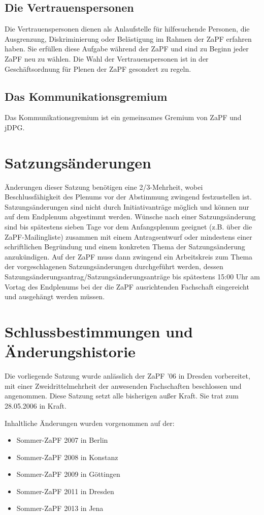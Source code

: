 \documentclass[draft,12pt,oneside]{scrreprt}
\begin{document}
\subsection{Die Vertrauenspersonen}

Die Vertrauenspersonen dienen als Anlaufstelle für hilfesuchende Personen, die
Ausgrenzung, Diskriminierung oder Belästigung im Rahmen der ZaPF erfahren haben.
Sie erfüllen diese Aufgabe während der ZaPF und sind zu Beginn jeder ZaPF neu
zu wählen.
Die Wahl der Vertrauenspersonen ist in der Geschäftsordnung für Plenen der ZaPF
gesondert zu regeln.

\subsection{Das Kommunikationsgremium}

Das Kommunikationsgremium ist ein gemeinsames Gremium von ZaPF und jDPG.

\section{Satzungsänderungen}
Änderungen dieser Satzung benötigen eine 2/3-Mehrheit, wobei Beschlussfähigkeit
des Plenums vor der Abstimmung zwingend festzustellen ist. Satzungsänderungen
sind nicht durch Initiativanträge möglich und können nur auf dem Endplenum
abgestimmt werden. Wünsche nach einer Satzungsänderung sind bis spätestens
sieben Tage vor dem Anfangsplenum geeignet (z.B. über die ZaPF-Mailingliste)
zusammen mit einem Antragsentwurf oder mindestens einer schriftlichen
Begründung und einem konkreten Thema der Satzungsänderung anzukündigen. Auf der
ZaPF muss dann zwingend ein Arbeitskreis zum Thema der vorgeschlagenen
Satzungsänderungen durchgeführt werden, dessen
Satzungsänderungsantrag/Satzungsänderungsanträge bis spätestens 15:00 Uhr am
Vortag des Endplenums bei der die ZaPF ausrichtenden Fachschaft eingereicht und
ausgehängt werden müssen.

\section*{Schlussbestimmungen und Änderungshistorie}
Die vorliegende Satzung wurde anlässlich der ZaPF '06 in Dresden vorbereitet,
mit einer Zweidrittelmehrheit der anwesenden Fachschaften beschlossen und
angenommen. Diese Satzung setzt alle bisherigen außer Kraft. Sie trat zum
28.05.2006 in Kraft.

Inhaltliche Änderungen wurden vorgenommen auf der:

\begin{itemize}

  \item Sommer-ZaPF 2007 in Berlin

  \item Sommer-ZaPF 2008 in Konstanz

  \item Sommer-ZaPF 2009 in Göttingen

  \item Sommer-ZaPF 2011 in Dresden

  \item Sommer-ZaPF 2013 in Jena

\end{itemize}
\end{document}
